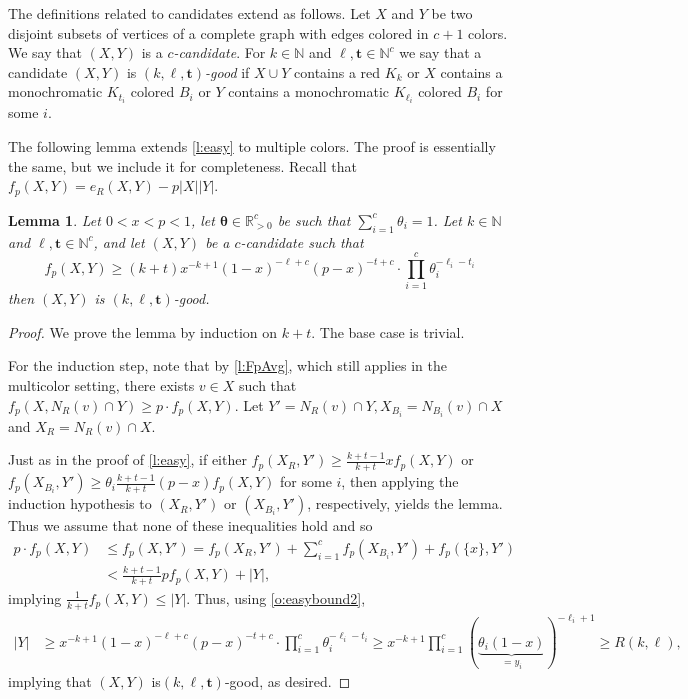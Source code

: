\documentclass[reqno,final,12pt]{amsart}
\newtheorem{lem}[thm]{Lemma}
\newcommand{\bb}[1]{\mathbb{#1}}
\newcommand{\bl}[1]{\boldsymbol{#1}}
\newcommand{\s}[1]{\left(#1\right)}
\begin{document}
The definitions related to candidates extend as follows.
Let $X$ and $Y$ be two disjoint subsets of vertices of a complete graph with edges colored in $c+1$ colors.  We say that $(X,Y)$ is a \emph{$c$-candidate}. For $k \in \bb{N}$ and $\bl{\ell},\bl{t} \in \bb{N}^c$ 
we say that a candidate $(X,Y)$ is \emph{$(k,\bl{\ell},\bl{t})$-good} if $X \cup Y$ contains a red $K_k$ or $X$ contains a monochromatic $K_{t_i}$ colored $B_i$ or $Y$ contains a monochromatic $K_{\ell_i}$ colored $B_i$ for some $i$.  

The following lemma extends \cref{l:easy} to multiple colors. The proof is essentially the same, but we include it for completeness. Recall that  $f_{p}(X,Y)=e_R(X,Y) - p|X||Y|$.

\begin{lem}\label{l:easy2}
	Let  $0<x<p<1$, let $\bl{\theta} \in  \bb{R}_{>0}^c$  be such that $\sum_{i=1}^c \theta_i=1$.  Let $k \in \bb{N}$ and  $\bl{\ell},\bl{t} \in \bb{N}^c$, and let $(X,Y)$ be a $c$-candidate such that 
	\begin{equation}\label{e:easy}
	f_{p}(X,Y) \geq  (k+t)x^{-k+1}(1-x)^{-\ell+c}(p-x)^{-t+c}\cdot \prod_{i=1}^c\theta_i^{-\ell_i-t_i} 
	\end{equation}	
	then $(X,Y)$ is $(k,\bl{\ell},\bl{t})$-good.
\end{lem}

\begin{proof} 
	We prove the lemma by induction on $k+t$. The base case is trivial. 
	
For the induction step, note that by  
 \cref{l:FpAvg}, which still applies in the multicolor setting, there exists $v \in X$ such that  $f_p(X,N_R(v) \cap Y) \geq p \cdot f_p(X,Y)$. Let $Y' = N_R(v) \cap Y, X_  {B_i}=  N_{B_i}(v) \cap X$ and $X_R=  N_R(v) \cap X$.
	
	Just as in the proof of \cref{l:easy}, if either $f_p(X_R,Y') \geq \frac{k+t-1}{k+t} x f_p(X,Y)$ or  $f_p(X_{B_i},Y') \geq 
	\theta_i\frac{k+t-1}{k+t}(p-x) f_p(X,Y)$ for some $i$, then applying the induction hypothesis to  $(X_R,Y')$ or  $(X_{B_i},Y')$, respectively, yields the lemma. Thus we assume that none of these inequalities hold and so
	\begin{align*}
		p \cdot f_p(X,Y) &\leq f_p(X,Y') = f_p(X_R,Y') + \sum_{i=1}^c f_p(X_{B_i},Y') + f_p(\{x\},Y') \\ &< \frac{k+t-1}{k+t}pf_p(X,Y) + |Y|,
	\end{align*}
implying
 $\frac{1}{{k+t}}f_p(X,Y) \leq |Y|$.
	Thus, using \cref{o:easybound2},
\begin{align*}
	|Y| &\geq  x^{-k+1}(1-x)^{-\ell+c}(p-x)^{-t+c}\cdot \prod_{i=1}^c\theta_i^{-\ell_i-t_i}  \geq x^{-k+1}\prod_{i=1}^c\s{ {\underbrace{\theta_i(1-x)}_{=y_i}}}^{-\ell_i+1} \geq  R(k,\bl{\ell}),
\end{align*}	
	implying that $(X,Y)$ is$(k,\bl{\ell},\bl{t})$-good, as desired. 
\end{proof}	
\end{document}
